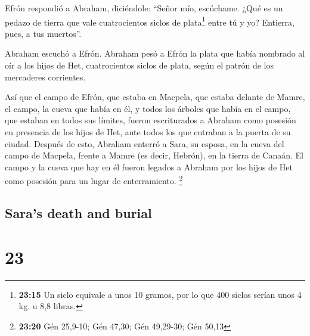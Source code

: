 \begin{paracol}{2}
 Efrón respondió a Abraham, diciéndole: 
``Señor mío, escúchame. ¿Qué es un pedazo de tierra que vale
cuatrocientos siclos de plata\footnote{\textbf{23:15} Un siclo equivale
  a unos 10 gramos, por lo que 400 siclos serían unos 4 kg. u 8,8
  libras.} entre tú y yo? Entierra, pues, a tus muertos''.

 Abraham escuchó a Efrón. Abraham pesó a Efrón la plata
que había nombrado al oír a los hijos de Het, cuatrocientos siclos de
plata, según el patrón de los mercaderes corrientes.

 Así que el campo de Efrón, que estaba en Macpela, que
estaba delante de Mamre, el campo, la cueva que había en él, y todos los
árboles que había en el campo, que estaban en todos sus límites, fueron
escriturados  a Abraham como posesión en presencia de los
hijos de Het, ante todos los que entraban a la puerta de su ciudad.
 Después de esto, Abraham enterró a Sara, su esposa, en
la cueva del campo de Macpela, frente a Mamre (es decir, Hebrón), en la
tierra de Canaán.  El campo y la cueva que hay en él
fueron legados a Abraham por los hijos de Het como posesión para un
lugar de enterramiento. \footnote{\textbf{23:20} Gén 25,9-10; Gén 47,30;
  Gén 49,29-30; Gén 50,13}

\switchcolumn
\begin{otherlanguage}{english}

\hypertarget{saras-death-and-burial}{%
\subsection{Sara's death and burial}\label{saras-death-and-burial}}

\hypertarget{section-45}{%
\section{23}\label{section-45}}


\end{otherlanguage}
\end{paracol}
